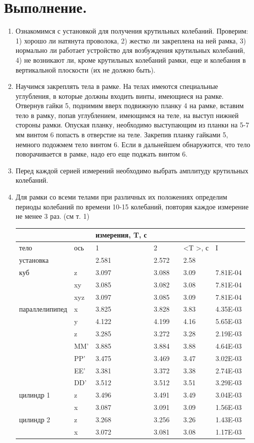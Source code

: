 \documentclass[a4paper,12pt]{article} %
\begin{document}
\section{Выполнение.}
\begin{enumerate}
\item Ознакомимся с установкой для получения крутильных колебаний. Проверим: 1) хорошо ли натянута проволока, 2) жестко ли закреплена на ней рамка, 3) нормально ли работает устройство для возбуждения крутильных колебаний, 4) не возникают ли, кроме крутильных колеба­ний рамки, еще и колебания в вертикальной плоскости (их не должно быть).

\item Научимся закреплять тела в рамке. На телах имеются специальные углубления, в которые должны входить винты, имеющиеся на рамке. Отвернув гайки 5, под­нимим вверх подвижную планку 4 на рамке, вставим тело в рамку, попав углублением, имеющимся на теле, на выступ нижней стороны рамки. Опуская планку, необходимо выступающим из планки на 5-7 мм вин­том 6 попасть в отверстие на теле. Закрепив планку гайками 5, немного подожмем тело винтом 6. Если в дальнейшем обнаружится, что тело поворачивается в рамке, надо его еще поджать винтом 6.

\item Перед каждой серией измерений необходимо выбрать амплитуду крутильных колебаний.

\item Для рамки со всеми телами при различных их положениях определим периоды колебаний по времени 10-15 колебаний, повторяя каждое измерение не менее 3 раз. (см т. 1)
\begin{table} [H]
\center

\begin{tabular}{l|l|lllll}
&&измерения, T, с&&&&\\
\hline
тело&ось&1&2&& \textless T \textgreater, с&I\\
\hline
установка&&2.581&2.572&& 2.58 &\\
куб&z&3.097&3.088&& 3.09 &7.81E-04\\
&xy&3.085&3.082&& 3.08 &7.81E-04\\
&xyz&3.097&3.085&& 3.09 &7.81E-04\\
параллелипипед&x&3.825&3.828&& 3.83 &4.35E-03\\
&y&4.122&4.199&& 4.16 &5.65E-03\\
&z&3.285&3.272&& 3.28 &2.19E-03\\
&MM'&3.885&3.884&& 3.88 &4.64E-03\\
&PP'&3.475&3.469&& 3.47 &3.02E-03\\
&EE'&3.381&3.372&& 3.38 &2.74E-03\\
&DD'&3.512&3.512&& 3.51 &3.29E-03\\
цилиндр 1&z&3.496&3.491&& 3.49 &3.04E-03\\
&x&3.087&3.091&& 3.09 &1.56E-03\\
цилиндр 2&z&3.268&3.256&& 3.26 &1.43E-03\\
&x&3.072&3.081&& 3.08 &1.17E-03\\


\end{tabular}
\end{table}
\end{enumerate}
\end{document}
